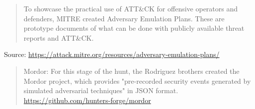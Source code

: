 \documentclass[Screen16to9,17pt]{foils}
\begin{document}


\begin{quote}
To showcase the practical use of ATT\&CK for offensive operators and defenders, MITRE created Adversary Emulation Plans. These are prototype documents of what can be done with publicly available threat reports and ATT\&CK.
\end{quote}
Source: \url{https://attack.mitre.org/resources/adversary-emulation-plans/}





\begin{quote}
Mordor: For this stage of the hunt, the Rodriguez brothers created the Mordor
project, which provides
"pre-recorded security events generated by simulated adversarial techniques" in
JSON format.\\
 \url{https://github.com/hunters-forge/mordor}
\end{quote}







\end{document}
